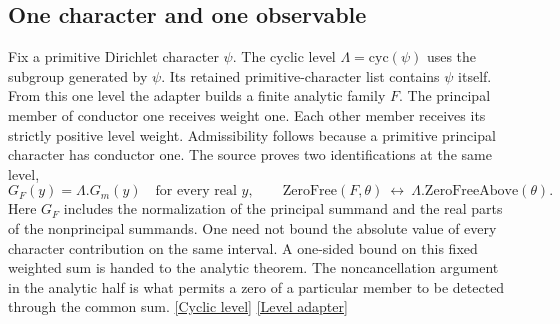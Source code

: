 \documentclass[12pt,letterpaper]{article}
\begin{document}
\subsection{One character and one observable}
Fix a primitive Dirichlet character \(\psi\). The cyclic level \(\Lambda=\mathrm{cyc}(\psi)\) uses the subgroup generated by \(\psi\). Its retained primitive-character list contains \(\psi\) itself. From this one level the adapter builds a finite analytic family \(F\). The principal member of conductor one receives weight one. Each other member receives its strictly positive level weight. Admissibility follows because a primitive principal character has conductor one. The source proves two identifications at the same level,
\[
    G_F(y)=\Lambda.G_m(y)\quad\text{for every real }y,\qquad
    \mathrm{ZeroFree}(F,\theta)
          \ \longleftrightarrow\ \Lambda.\mathrm{ZeroFreeAbove}(\theta).
\]
Here \(G_F\) includes the normalization of the principal summand and the real parts of the nonprincipal summands. One need not bound the absolute value of every character contribution on the same interval. A one-sided bound on this fixed weighted sum is handed to the analytic theorem. The noncancellation argument in the analytic half is what permits a zero of a particular member to be detected through the common sum. \href{https://github.com/nousentllc/riemann-hypothesis/blob/40e56bab026552e089d7afcfeff08d2defb9c005/src/Formalism/SharpRestriction/RamificationFrobenius/TotientGaloisClasses/ExplicitFormulaErrorOfHostConditions.lean#L121-L125}{\textsf{[Cyclic level]}} \href{https://github.com/nousentllc/riemann-hypothesis/blob/40e56bab026552e089d7afcfeff08d2defb9c005/src/Development/AutomorphicArithmetic/PrimitiveCosets/LevelFamily.lean#L27-L52}{\textsf{[Level adapter]}}
\end{document}
